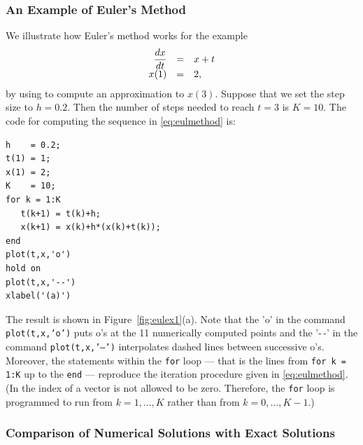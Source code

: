 \documentclass{ximera}
\begin{document}
\subsubsection*{An Example of Euler's Method}
We illustrate how Euler's method works for the example
\arraystart
\begin{equation}  \label{eq:eulexivp}
\begin{array}{rcl}
\displaystyle\frac{dx}{dt} & = & x+t\\
  x(1) & = & 2,
\end{array}
\end{equation}
\arrayfinish
by using \Matlab to compute an approximation to $x(3)$.  Suppose that we
set the step size to $h = 0.2$.  Then the number of steps needed to reach 
$t=3$ is $K=10$.  The code for computing the sequence in 
\eqref{eq:eulmethod} is:

\begin{verbatim}
h    = 0.2;
t(1) = 1;
x(1) = 2;
K    = 10;
for k = 1:K
   t(k+1) = t(k)+h;
   x(k+1) = x(k)+h*(x(k)+t(k));
end
plot(t,x,'o')
hold on
plot(t,x,'--')
xlabel('(a)')
\end{verbatim}
The result is shown in Figure~\ref{fig:eulex1}(a).  Note that the
{\sf 'o'} in the \Matlab command {\tt plot(t,x,'o')} puts o's at the 11 
numerically computed points and the {\sf '-\,-'} in the command
{\tt plot(t,x,'--')} interpolates dashed lines between successive o's. 
Moreover, the statements within the {\tt for} loop --- that is the
lines from {\tt for k = 1:K} up to the {\tt end} --- 
reproduce the iteration procedure given in \eqref{eq:eulmethod}.
(In \Matlab the index of a vector is not allowed to be zero. Therefore, 
the {\tt for} loop is programmed to run from $k=1,\ldots,K$ rather than 
from $k=0,\ldots,K-1$.)

\subsubsection*{Comparison of Numerical Solutions with Exact Solutions}
\end{document}

